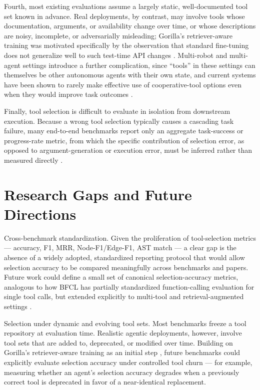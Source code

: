 \documentclass[acmsmall]{acmart}
\begin{document}
Fourth, most existing evaluations assume a largely static, well-documented tool set known in advance. Real deployments, by contrast, may involve tools whose documentation, arguments, or availability change over time, or whose descriptions are noisy, incomplete, or adversarially misleading; Gorilla's retriever-aware training was motivated specifically by the observation that standard fine-tuning does not generalize well to such test-time API changes \citep{patil2023gorilla}. Multi-robot and multi-agent settings introduce a further complication, since ``tools'' in these settings can themselves be other autonomous agents with their own state, and current systems have been shown to rarely make effective use of cooperative-tool options even when they would improve task outcomes \citep{zhang2025toolroco}.

Finally, tool selection is difficult to evaluate in isolation from downstream execution. Because a wrong tool selection typically causes a cascading task failure, many end-to-end benchmarks report only an aggregate task-success or progress-rate metric, from which the specific contribution of selection error, as opposed to argument-generation or execution error, must be inferred rather than measured directly \citep{mohammadi2025evaluation,jia2025autotool}.

\section{Research Gaps and Future Directions}
\label{sec:gaps}

Cross-benchmark standardization. Given the proliferation of tool-selection metrics --- accuracy, F1, MRR, Node-F1/Edge-F1, AST match --- a clear gap is the absence of a widely adopted, standardized reporting protocol that would allow selection accuracy to be compared meaningfully across benchmarks and papers. Future work could define a small set of canonical selection-accuracy metrics, analogous to how BFCL has partially standardized function-calling evaluation for single tool calls, but extended explicitly to multi-tool and retrieval-augmented settings \citep{patil2025bfcl,shen2023taskbench}.

Selection under dynamic and evolving tool sets. Most benchmarks freeze a tool repository at evaluation time. Realistic agentic deployments, however, involve tool sets that are added to, deprecated, or modified over time. Building on Gorilla's retriever-aware training as an initial step \citep{patil2023gorilla}, future benchmarks could explicitly evaluate selection accuracy under controlled tool churn --- for example, measuring whether an agent's selection accuracy degrades when a previously correct tool is deprecated in favor of a near-identical replacement.
\end{document}
